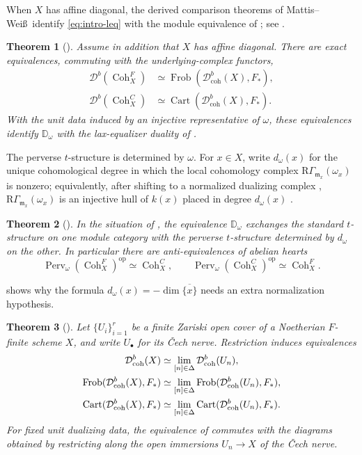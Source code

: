 \documentclass[11pt]{amsart}
\newcommand{\Cart}{\operatorname{Cart}}
\newcommand{\op}{{\operatorname{op}}}
\renewcommand{\lim}{\operatornamewithlimits{\rm{lim}}}
\newcommand{\Coh}{\operatorname{{Coh}}}
\newcommand{\Frob}{\operatorname{Frob}}
\newcommand{\Dbc}{\mathcal D^b_{\mathrm{coh}}}
\newcommand{\Db}{\mathcal D^b}
\newcommand{\Perv}{\operatorname{Perv}}
\theoremstyle{plain}
\newtheorem{introthm}{Theorem}
\theoremstyle{definition}
\numberwithin{equation}{section}
\begin{document}
When $X$ has affine diagonal, the derived comparison theorems of Mattis--Wei\ss\ identify \eqref{eq:intro-leq} with the module equivalence of ; see .

\begin{introthm}[{}]\label{thm:intro-comparison}
Assume in addition that $X$ has affine diagonal.
There are exact equivalences, commuting with the underlying-complex functors,
\begin{align*}
 \Db(\Coh^F_X)&\simeq\Frob(\Dbc(X),F_*),\\
 \Db(\Coh^C_X)&\simeq\Cart(\Dbc(X),F_*).
\end{align*}
With the unit data induced by an injective representative of $\omega$, these equivalences identify $\mathbb D_\omega$ with the lax-equalizer duality of .
\end{introthm}

The perverse $t$-structure is determined by $\omega$.
For $x\in X$, write $d_\omega(x)$ for the unique cohomological degree in which the local cohomology complex $\mathrm R\Gamma_{\mathfrak m_x}(\omega_x)$ is nonzero; equivalently, after shifting to a normalized dualizing complex \cite[\href{https://stacks.math.columbia.edu/tag/0AWF}{Tag 0AWF}]{SP}, $\mathrm R\Gamma_{\mathfrak m_x}(\omega_x)$ is an injective hull of $k(x)$ placed in degree $d_\omega(x)$ \cite[\href{https://stacks.math.columbia.edu/tag/0A82}{Tag 0A82}]{SP}.

\begin{introthm}[{}]\label{thm:intro-perverse}
In the situation of , the equivalence $\mathbb D_\omega$ exchanges the standard $t$-structure on one module category with the perverse $t$-structure determined by $d_\omega$ on the other.
In particular there are anti-equivalences of abelian hearts
\[
 \Perv_\omega(\Coh^F_X)^{\op}\simeq\Coh^C_X,
 \qquad
 \Perv_\omega(\Coh^C_X)^{\op}\simeq\Coh^F_X.
\]
\end{introthm}
 shows why the formula $d_\omega(x)=-\dim\overline{\{x\}}$ needs an extra normalization hypothesis.

\begin{introthm}[{}]\label{thm:intro-descent}
Let $\{U_i\}_{i=1}^r$ be a finite Zariski open cover of a Noetherian $F$-finite scheme $X$, and write $U_\bullet$ for its \v Cech nerve.
Restriction induces equivalences
\begin{align*}
 \Dbc(X)&\simeq\lim_{[n]\in\Delta}\Dbc(U_n),\\
 \Frob(\Dbc(X),F_*)&\simeq\lim_{[n]\in\Delta}\Frob(\Dbc(U_n),F_*),\\
 \Cart(\Dbc(X),F_*)&\simeq\lim_{[n]\in\Delta}\Cart(\Dbc(U_n),F_*).
\end{align*}
For fixed unit dualizing data, the equivalence of  commutes with the diagrams obtained by restricting along the open immersions $U_n\to X$ of the \v Cech nerve.
\end{introthm}
\end{document}
